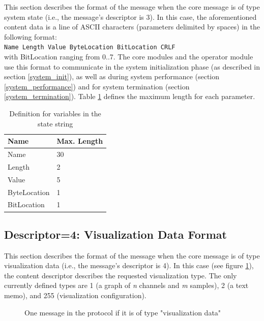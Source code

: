 \documentclass[letterpaper,oneside,12pt]{book}
\begin{document}
This section describes the format of the message when the core message is of 
type system state (i.e., the message's descriptor is 3). In this case, the 
aforementioned content data is a line of ASCII characters (parameters
delimited by spaces) in the following format:
\\[2ex]
\verb|Name Length Value ByteLocation BitLocation CRLF|
\\[2ex]
with BitLocation ranging from 0..7.
The core modules and the operator module use this format to communicate in 
the system initialization phase (as described in section \ref{system_init}), 
as well as during system performance (section \ref{system_performance}) and 
for system termination (section \ref{system_termination}). Table 
\ref{state_table} defines the maximum length for each parameter.

\begin{table}[ht]
 \centering
 \begin{tabular}{|l|l|}
  \hline
  \textbf{Name} & \textbf{Max. Length} \\
  \hline
  Name & 30 \\
  \hline
  Length & 2 \\
  \hline
  Value & 5 \\
  \hline
  ByteLocation & 1 \\
  \hline
  BitLocation & 1 \\
  \hline
 \end{tabular}
 \caption{Definition for variables in the state string}
 \label{state_table}
\end{table}   

\subsection{Descriptor=4: Visualization Data Format}
\label{visualizationdata_format}

This section describes the format of the message when the core message is of 
type visualization data (i.e., the message's descriptor is 4). In this case (see 
figure \ref{visualizationprotocol}), the content descriptor describes the 
requested visualization type. The only currently defined types are 1 (a graph of 
\textit{n} channels and \textit{m} samples), 2 (a text memo), and 255 
(visualization configuration).

\begin{figure}[ht]
 \centerline{}
 \caption{One message in the protocol if it is of type "visualization data"}
 \label{visualizationprotocol}
\end{figure}
\end{document}

